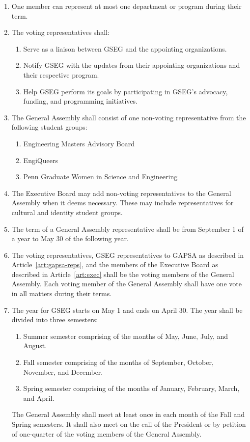 \begin{enumerate}[label=\Alph*.]
	\item One member can represent at most one department or program during their term.

	\item The voting representatives shall:
	\begin{enumerate}
		\item Serve as a liaison between GSEG and the appointing organizations.
		\item Notify GSEG with the updates from their appointing organizations and their
		respective program.
		\item Help GSEG perform its goals by participating in GSEG's advocacy, funding,
		and programming initiatives.
	\end{enumerate}

	\item The General Assembly shall consist of one non-voting representative from the following
	student groups:
	\begin{enumerate}[label=(\roman*)]
		\item Engineering Masters Advisory Board
		\item EngiQueers
		\item Penn Graduate Women in Science and Engineering
	\end{enumerate}

	\item The Executive Board may add non-voting representatives to the General Assembly 
	when it deems necessary. These may include representatives for cultural and identity
	student groups.  

	\item The term of a General Assembly representative shall be from September 1 of a year to 
	May 30 of the following year.

	\item The voting representatives, GSEG representatives to GAPSA as described in 
	Article~\ref{art:gapsa-reps}, and the members of the Executive Board as described in 
	Article~\ref{art:exec} shall be the voting members of the General Assembly. Each voting member
	of the General Assembly	shall have one vote in all matters during their terms. 

	\item The year for GSEG starts on May 1 and ends on April 30. The year shall be divided into
	three semesters:
	\begin{enumerate}[label=(\roman*)]
		\item Summer semester comprising of the months of May, June, July, and August. 
		\item Fall semester comprising of the months of September, October, November, and December.
		\item Spring semester comprising of the months of January, February, March, and April.
	\end{enumerate}
	The General Assembly shall meet at least once in each month of the Fall and Spring semesters.
	It shall also meet on the call of the President or by petition of one-quarter of the voting
	members of the General Assembly.


\end{enumerate}
